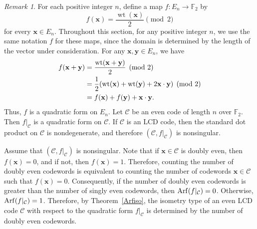\documentclass{article}
\theoremstyle{definition}
\theoremstyle{remark}
\newtheorem{remark}{Remark}
\begin{document}
\begin{remark}\label{evenArf}
For each positive integer $n$, define a map
$f:E_n\to\mathbb{F}_2$ by
\[
f(\mathbf{x})=\frac{\operatorname{wt}(\mathbf{x})}{2}\pmod 2
\]
for every $\mathbf{x}\in E_n$. Throughout this section, for any positive integer $n$, we use the same notation $f$ for these maps, since the domain is determined by the length of the vector under consideration. For any
$\mathbf{x},\mathbf{y}\in E_n$, we have
\begin{align*}
    f(\mathbf{x}+\mathbf{y})&=\frac{{\rm{wt}}(\mathbf{x+\mathbf{y}})}{2}\pmod 2\\&=\frac{1}{2}({\rm{wt}}(\mathbf{x})+{\rm{wt}}(\mathbf{y})+2\mathbf{x}\cdot \mathbf{y})\pmod 2\\&=f(\mathbf{x})+f(\mathbf{y})+\mathbf{x}\cdot\mathbf{y}.
\end{align*}
Thus, $f$ is a quadratic form on $E_n$. Let $\mathcal{C}$ be an even code of length $n$ over $\mathbb{F}_2$. Then $f|_{\mathcal{C}}$ is a quadratic form on $\mathcal{C}$. If $\mathcal{C}$ is an LCD code, then the standard dot product on $\mathcal{C}$ is nondegenerate, and therefore $(\mathcal{C}, f|_\mathcal{C})$ is nonsingular.

Assume that $(\mathcal{C}, f|_\mathcal{C})$ is nonsingular. Note that if $\mathbf{x}\in\mathcal{C}$ is doubly even, then $f(\mathbf{x})=0$, and if not, then $f(\mathbf{x})=1$. Therefore, counting the number of doubly even codewords is equivalent to counting the number of codewords $\mathbf{x}\in\mathcal{C}$ such that $f(\mathbf{x})=0$. Consequently, if the number of doubly even codewords is greater than the number of singly even codewords, then ${\rm Arf}(f|_\mathcal{C})=0$. Otherwise, ${\rm Arf}(f|_\mathcal{C})=1$. Therefore, by Theorem~\ref{Arfiso}, the isometry type of an even LCD code $\mathcal{C}$ with respect to the quadratic form $f|_\mathcal{C}$ is determined by the number of doubly even codewords.
\end{remark}
\end{document}
